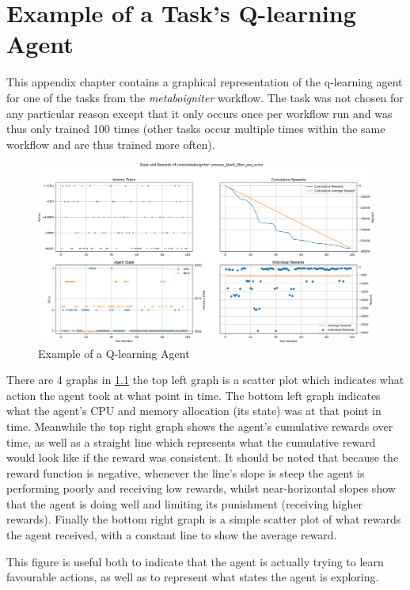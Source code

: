 
\cleardoublepage
\chapter{Example of a Task’s Q-learning Agent}
\label{cha:qagent_example}

This appendix chapter contains a graphical representation of the q-learning agent for one of the tasks from the \textit{metaboigniter} workflow. The task was not chosen for any particular reason except that it only occurs once per workflow run and was thus only trained 100 times (other tasks occur multiple times within the same workflow and are thus trained more often). 

\begin{figure}[ht]
    \centering
	\includegraphics[width=\textwidth]{fig/qagent_cropped.png}
	\caption{Example of a Q-learning Agent}
	\label{fig:q_example}
\end{figure}

There are 4 graphs in \ref{fig:q_example} the top left graph is a scatter plot which indicates what action the agent took at what point in time. The bottom left graph indicates what the agent’s CPU and memory allocation (its state) was at that point in time. Meanwhile the top right graph shows the agent’s cumulative rewards over time, as well as a straight line which represents what the cumulative reward would look like if the reward was consistent. It should be noted that because the reward function is negative, whenever the line’s slope is steep the agent is performing poorly and receiving low rewards, whilst near-horizontal slopes show that the agent is doing well and limiting its punishment (receiving higher rewards). Finally the bottom right graph is a simple scatter plot of what rewards the agent received, with a constant line to show the average reward.

This figure is useful both to indicate that the agent is actually trying to learn favourable actions, as well as to represent what states the agent is exploring. 
